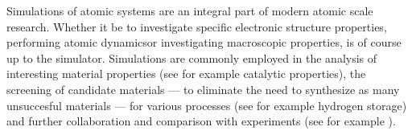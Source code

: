 Simulations of atomic systems are an integral part of modern atomic scale research.
Whether it be to investigate specific electronic structure properties\citemiss, performing atomic dynamics\citemiss or investigating macroscopic properties\citemiss, is of course up to the simulator.
Simulations are commonly employed in the analysis of interesting material properties (see for example catalytic properties\citemiss), the screening of candidate materials --- to eliminate the need to synthesize as many unsuccesful materials --- for various processes (see for example hydrogen storage\citmiss) and further collaboration and comparison with experiments (see for example \citmiss).





\placeholder
